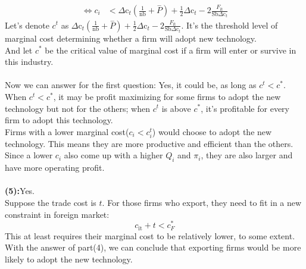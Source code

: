 \documentclass{article}
\begin{document}
\begin{description}
\begin{align}
      \Longleftrightarrow c_i&<\text{$\Delta $c}_t\left(\frac{1}{\text{nb}}+\overset{-}{P}\right)+\frac{1}{2}\text{$\Delta $c}_t-2\frac{F_{\text{it}}}{\text{Sb$\Delta $c}_t}
    \end{align}
    Let's denote $c^{t}$ as $\text{$\Delta $c}_t\left(\frac{1}{\text{nb}}+\overset{-}{P}\right)+\frac{1}{2}\text{$\Delta $c}_t-2\frac{F_{\text{it}}}{\text{Sb$\Delta $c}_t}$. It's the threshold level of marginal cost determining whether a firm will adopt new technology.\\
    And let $c^*$ be the critical value of marginal cost if a firm will enter or survive in this industry.\\\\
    Now we can answer for the first question: Yes, it could be, as long as $c^{t}<c^*$. When $c^{t}<c^*$, it may be profit maximizing for some firms to adopt the new technology but not for the others; when $c^{t}$ is above $c^*$, it's profitable for every firm to adopt this technology.\\
    Firms with a lower marginal cost($c_i<c_i^{t}$) would choose to adopt the new technology. This means they are more productive and efficient than the others. Since a lower $c_i$ also come up with a higher $Q_i$ and $\pi _i$, they are also larger and have more operating profit. \\\\
    {\bf (5):}Yes.\\
    Suppose the trade cost is $t$. For those firms who export, they need to fit in a new constraint in foreign market:$$c_{\text{it}}+t<c_F^*$$
    This at least requires their marginal cost to be relatively lower, to some extent. With the answer of part(4), we can conclude that exporting firms would be more likely to adopt the new technology.
\end{description}
\end{document}

